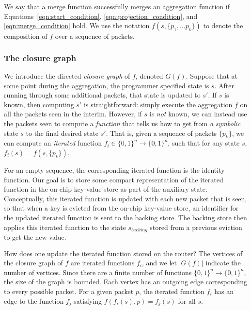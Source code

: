 We say that a merge function successfully merges an aggregation function if
Equations~\ref{eqn:start_condition}, \ref{eqn:projection_condition}, and
\ref{eqn:merge_condition} hold. We use the notation $f(s, \{p_1, \ldots p_k\})$
to denote the composition of $f$ over a sequence of packets. 

\subsubsection{The closure graph}
\label{ss:closure}

We introduce the directed \emph{closure graph} of $f$, denoted $G(f)$. Suppose
that at some point during the aggregation, the programmer specified state is
$s$. After running through some additional packets, that state is updated to
$s'$. If $s$ is known, then computing $s'$ is straightforward: simply execute
the aggregation $f$ on all the packets seen in the interim. However, if $s$ is
\emph{not} known, we can instead use the packets seen to compute a {\em function}
that tells us how to get from \emph{a symbolic} state $s$ to the final desired
state $s'$. That is, given a sequence of packets $\{p_k\}$, we can compute an
\emph{iterated} function $f_i \in \{0,1\}^n \rightarrow \{0,1\}^n$, such that
for any state $s$, $f_i(s) = f(s, \{p_k\})$.

For an empty sequence, the corresponding iterated function is the identity
function.  Our goal is to store some compact representation of the iterated
function in the on-chip key-value store as part of the auxiliary state.
Conceptually, this iterated function is updated with each new packet that is
seen, so that when a key is evicted from the on-chip key-value store, an
identifier for the updated iterated function is sent to the backing store.  The
backing store then applies this iterated function to the state $s_{backing}$
stored from a previous eviction to get the new value.

How does one update the iterated function stored on the router? The vertices of
the closure graph of $f$ are iterated functions $f_i$, and we let $|G(f)|$
indicate the number of vertices. Since there are a finite number of functions
$\{0, 1\}^n \rightarrow \{0, 1\}^n$, the size of the graph is bounded.  Each
vertex has an outgoing edge corresponding to every possible packet. For a given
packet $p$, the iterated function $f_i$ has an edge to the function $f_j$
satisfying $f(f_i(s), p) = f_j(s)$ for all $s$.

